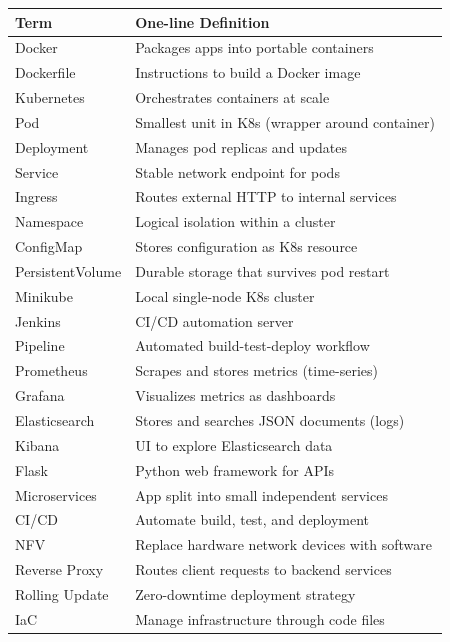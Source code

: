 \documentclass[12pt,a4paper]{article}
\begin{document}
\begin{longtable}{@{}p{4cm}p{10cm}@{}}
\toprule
\textbf{Term} & \textbf{One-line Definition} \\
\midrule
Docker & Packages apps into portable containers \\
Dockerfile & Instructions to build a Docker image \\
Kubernetes & Orchestrates containers at scale \\
Pod & Smallest unit in K8s (wrapper around container) \\
Deployment & Manages pod replicas and updates \\
Service & Stable network endpoint for pods \\
Ingress & Routes external HTTP to internal services \\
Namespace & Logical isolation within a cluster \\
ConfigMap & Stores configuration as K8s resource \\
PersistentVolume & Durable storage that survives pod restart \\
Minikube & Local single-node K8s cluster \\
Jenkins & CI/CD automation server \\
Pipeline & Automated build-test-deploy workflow \\
Prometheus & Scrapes and stores metrics (time-series) \\
Grafana & Visualizes metrics as dashboards \\
Elasticsearch & Stores and searches JSON documents (logs) \\
Kibana & UI to explore Elasticsearch data \\
Flask & Python web framework for APIs \\
Microservices & App split into small independent services \\
CI/CD & Automate build, test, and deployment \\
NFV & Replace hardware network devices with software \\
Reverse Proxy & Routes client requests to backend services \\
Rolling Update & Zero-downtime deployment strategy \\
IaC & Manage infrastructure through code files \\
\bottomrule
\end{longtable}
\end{document}
